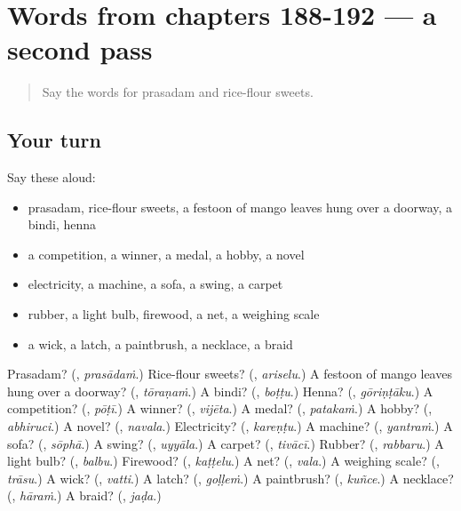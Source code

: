 \section[(dialogue)]{Words from chapters 188-192 — a second pass}

\label{lesson:TE-R192-second-pass-words-from-chapters-188-192}



\begin{quote}
Say the words for prasadam and rice-flour sweets.
\end{quote}

\subsection*{Your turn}
Say these aloud:

\begin{itemize}
\raggedright
  \item prasadam, rice-flour sweets, a festoon of mango leaves hung over a doorway, a bindi, henna
  \item a competition, a winner, a medal, a hobby, a novel
  \item electricity, a machine, a sofa, a swing, a carpet
  \item rubber, a light bulb, firewood, a net, a weighing scale
  \item a wick, a latch, a paintbrush, a necklace, a braid
\end{itemize}

\begin{tcolorbox}[breakable,colback=teal!4,colframe=teal!35!black,title={Before you move on}]
Prasadam? (\textbf{}, \emph{prasādaṁ}.) Rice-flour sweets? (\textbf{}, \emph{ariselu}.) A festoon of mango leaves hung over a doorway? (\textbf{}, \emph{tōraṇaṁ}.) A bindi? (\textbf{}, \emph{boṭṭu}.) Henna? (\textbf{}, \emph{gōriṇṭāku}.) A competition? (\textbf{}, \emph{pōṭī}.) A winner? (\textbf{}, \emph{vijēta}.) A medal? (\textbf{}, \emph{patakaṁ}.) A hobby? (\textbf{}, \emph{abhiruci}.) A novel? (\textbf{}, \emph{navala}.) Electricity? (\textbf{}, \emph{kareṇṭu}.) A machine? (\textbf{}, \emph{yantraṁ}.) A sofa? (\textbf{}, \emph{sōphā}.) A swing? (\textbf{}, \emph{uyyāla}.) A carpet? (\textbf{}, \emph{tivācī}.) Rubber? (\textbf{}, \emph{rabbaru}.) A light bulb? (\textbf{}, \emph{balbu}.) Firewood? (\textbf{}, \emph{kaṭṭelu}.) A net? (\textbf{}, \emph{vala}.) A weighing scale? (\textbf{}, \emph{trāsu}.) A wick? (\textbf{}, \emph{vatti}.) A latch? (\textbf{}, \emph{goḷḷeṁ}.) A paintbrush? (\textbf{}, \emph{kuñce}.) A necklace? (\textbf{}, \emph{hāraṁ}.) A braid? (\textbf{}, \emph{jaḍa}.)
\end{tcolorbox}
